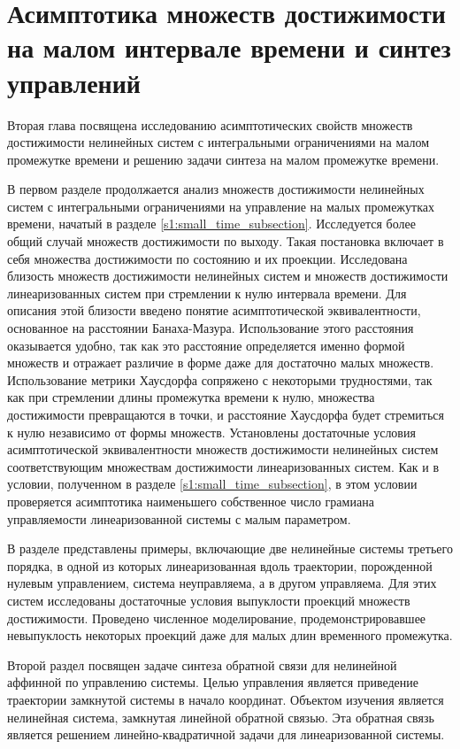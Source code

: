 \documentclass[../main.tex]{subfiles}
\begin{document}
\clearpage
\section{Асимптотика множеств достижимости на малом интервале времени и синтез управлений}

Вторая глава посвящена исследованию асимптотических свойств множеств достижимости нелинейных систем с интегральными ограничениями на малом промежутке времени и решению задачи синтеза на малом промежутке времени. 

В первом разделе продолжается анализ множеств достижимости нелинейных систем с интегральными ограничениями на управление на малых промежутках времени, начатый в разделе \ref{s1:small_time_subsection}. 
Исследуется более общий случай множеств достижимости по выходу.
Такая постановка включает в себя множества достижимости по состоянию и их проекции.
Исследована близость множеств достижимости нелинейных систем и множеств достижимости линеаризованных систем при стремлении к нулю интервала времени. 
Для описания этой близости введено понятие асимптотической эквивалентности, основанное на расстоянии Банаха-Мазура. 
Использование этого расстояния оказывается удобно, так как это расстояние определяется именно формой множеств и отражает различие в форме даже для достаточно малых множеств. 
Использование метрики Хаусдорфа сопряжено с некоторыми трудностями, так как при стремлении длины промежутка времени к нулю, множества достижимости  превращаются в точки, и расстояние Хаусдорфа будет стремиться к нулю независимо от формы множеств.
Установлены достаточные условия асимптотической эквивалентности множеств достижимости нелинейных систем соответствующим множествам достижимости линеаризованных систем.
Как и в условии, полученном в разделе \ref{s1:small_time_subsection}, в этом условии проверяется асимптотика наименьшего собственное число грамиана управляемости линеаризованной системы с малым параметром.

В разделе представлены примеры, включающие две нелинейные системы третьего порядка, в одной из которых линеаризованная вдоль траектории, порожденной нулевым управлением, система неуправляема, а в другом управляема.
Для этих систем исследованы достаточные условия выпуклости проекций множеств достижимости. 
Проведено численное моделирование, продемонстрировавшее невыпуклость некоторых проекций даже для малых длин временного промежутка.

Второй раздел посвящен задаче синтеза обратной связи для нелинейной аффинной по управлению системы. 
Целью управления является приведение траектории замкнутой системы в начало координат. 
Объектом изучения является нелинейная система, замкнутая линейной обратной связью. 
Эта обратная связь является решением линейно-квадратичной задачи для линеаризованной системы. 
\end{document}

